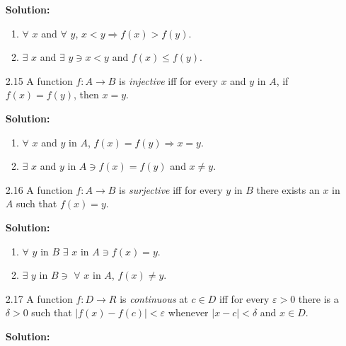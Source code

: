 \begin{enumerate}
      \textbf{Solution:}
      
      \begin{enumerate}
         \item $\forall$ $x$ and $\forall$ $y$, $x < y \Rightarrow
               f(x) > f(y)$.
         \item $\exists$ $x$ and $\exists$ $y \ni x < y$ and $f(x) \le f(y)$.
      \end{enumerate}
   \item[2.15] A function $f : A \rightarrow B$ is \textit{injective} iff for 
               every $x$ and $y$ in $A$, if $f(x) = f(y)$, then $x = y$.

      \textbf{Solution:}
      
      \begin{enumerate}
         \item $\forall$ $x$ and $y$ in $A$, $f(x) = f(y) \Rightarrow x = y$.
         \item $\exists$ $x$ and $y$ in $A \ni f(x) = f(y)$ and $x \neq y$.
      \end{enumerate}
   \item[2.16] A function $f : A \rightarrow B$ is \textit{surjective} iff for 
               every $y$ in $B$ there exists an $x$ in $A$ such that $f(x) = y$.

      \textbf{Solution:}
      
      \begin{enumerate}
         \item $\forall$ $y$ in $B$ $\exists$ $x$ in $A \ni f(x) = y$.
         \item $\exists$ $y$ in $B \ni$ $\forall$ $x$ in $A$, $f(x) \neq y$.
      \end{enumerate}
   \item[2.17] A function $f : D \rightarrow R$ is \textit{continuous} at
               $c \in D$ iff for every $\varepsilon > 0$ there is a $\delta > 0$
               such that $|f(x) - f(c)| < \varepsilon$ whenever
               $|x - c| < \delta$ and $x \in D$.

      \textbf{Solution:}
      

\end{enumerate}
